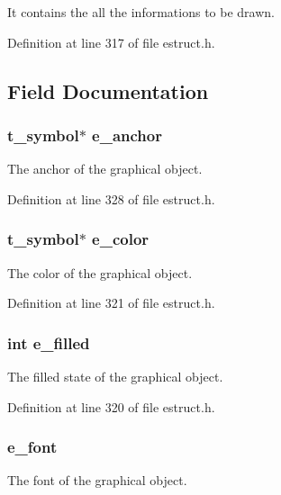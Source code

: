 It contains the all the informations to be drawn. 

Definition at line 317 of file estruct.\-h.



\subsection{Field Documentation}
\hypertarget{struct__egobj_a26003aea4ac1d50f79a5db2e05599222}{
\subsubsection[{e\-\_\-anchor}]{\setlength{\rightskip}{0pt plus 5cm}t\-\_\-symbol$\ast$ e\-\_\-anchor}}\label{struct__egobj_a26003aea4ac1d50f79a5db2e05599222}
The anchor of the graphical object. 

Definition at line 328 of file estruct.\-h.

\hypertarget{struct__egobj_a13dfb00aea95e0dc5b9d1297260a9280}{
\subsubsection[{e\-\_\-color}]{\setlength{\rightskip}{0pt plus 5cm}t\-\_\-symbol$\ast$ e\-\_\-color}}\label{struct__egobj_a13dfb00aea95e0dc5b9d1297260a9280}
The color of the graphical object. 

Definition at line 321 of file estruct.\-h.

\hypertarget{struct__egobj_ae13e50cb319a060b3e612c39d0fc698d}{
\subsubsection[{e\-\_\-filled}]{\setlength{\rightskip}{0pt plus 5cm}int e\-\_\-filled}}\label{struct__egobj_ae13e50cb319a060b3e612c39d0fc698d}
The filled state of the graphical object. 

Definition at line 320 of file estruct.\-h.

\hypertarget{struct__egobj_a4bf02b4e1a6c0c7723b5ed198f45e0b0}{
\subsubsection[{e\-\_\-font}]{ e\-\_\-font}}\label{struct__egobj_a4bf02b4e1a6c0c7723b5ed198f45e0b0}
The font of the graphical object. 

